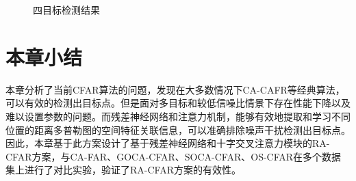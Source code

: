 \begin{figure}[htbp]
	\centering
	\caption{四目标检测结果}
	\label{fig:四目标检测结果}
\end{figure}

\section{本章小结}
本章分析了当前CFAR算法的问题，发现在大多数情况下CA-CAFR等经典算法，可以有效的检测出目标点。但是面对多目标和较低信噪比情景下存在性能下降以及难以设置参数的问题。而残差神经网络和注意力机制，能够有效地提取和学习不同位置的距离多普勒图的空间特征关联信息，可以准确排除噪声干扰检测出目标点。因此，本章基于此方案设计了基于残差神经网络和十字交叉注意力模块的RA-CFAR方案，与CA-FAR、GOCA-CFAR、SOCA-CFAR、OS-CFAR在多个数据集上进行了对比实验，验证了RA-CFAR方案的有效性。


